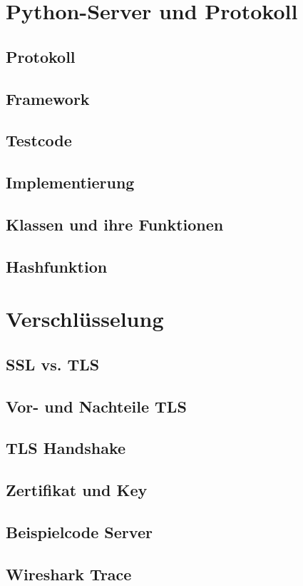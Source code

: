 \documentclass[12pt,a4paper]{scrreprt}
\begin{document}
\section{Python-Server und Protokoll}
\subsection{Protokoll}
\subsection{Framework}
\subsection{Testcode}
\subsection{Implementierung}
\subsection{Klassen und ihre Funktionen}
\subsection{Hashfunktion}

\section{Verschlüsselung}
\subsection{SSL vs. TLS}
\subsection{Vor- und Nachteile TLS}
\subsection{TLS Handshake}
\subsection{Zertifikat und Key}
\subsection{Beispielcode Server}
\subsection{Wireshark Trace}
\end{document}
